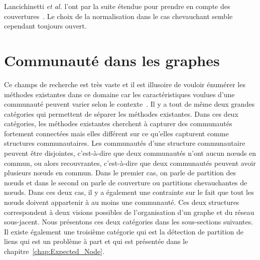 Lancichinetti \emph{et al.} l'ont par la suite étendue pour prendre en compte des couvertures~\cite{Lancichinetti2009c}.
Le choix de la normalisation dans le cas chevauchant semble cependant toujours ouvert\cite{McDaid2011,Zhang2015}.



\section{Communauté dans les graphes}
\label{sec:intro_communaute}

Ce champs de recherche est très vaste et il est illusoire de vouloir énumérer les méthodes existantes dans ce domaine car les caractéristiques voulues d'une communauté peuvent varier selon le contexte~\cite{Coscia2011,Leskovec2008,Yang2015,Jeub2015}.
Il y a tout de même deux grandes catégories qui permettent de séparer les méthodes existantes.
Dans ces deux catégories, les méthodes existantes cherchent à capturer 
des communautés fortement connectées mais elles différent sur ce qu'elles capturent comme structures communautaires.
Les communautés d'une structure communautaire peuvent être disjointes, c'est-à-dire que deux communautés n'ont aucun n\oe uds en commun, ou alors recouvrantes, c'est-à-dire que deux communautés peuvent avoir plusieurs n\oe uds en commun.
Dans le premier cas, on parle de partition des n\oe uds et dans le second on parle de couverture ou partitions chevauchantes de n\oe uds.
Dans ces deux cas, il y a également une contrainte sur le fait que tout les n\oe uds doivent appartenir à au moins une communauté.
Ces deux structures correspondent à deux visions possibles de l'organisation d'un graphe et du réseau sous-jacent.
Nous présentons ces deux catégories dans les sous-sections suivantes.
Il existe également une troisième catégorie qui est la détection de partition de liens qui est un problème à part et qui est présentée dans le chapitre~\ref{chap:Expected_Node}.

